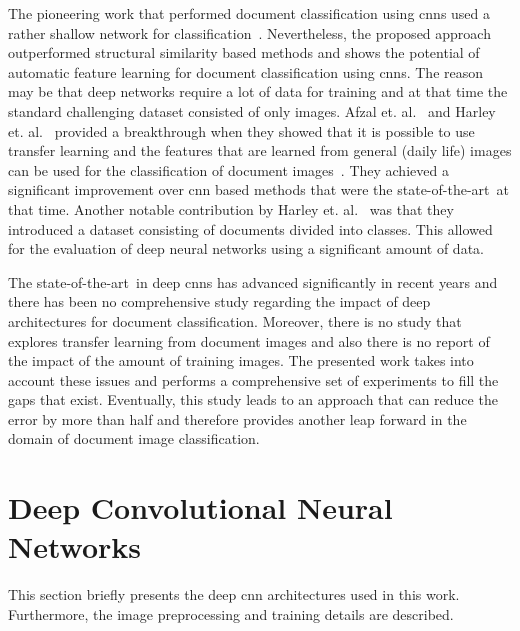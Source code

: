 \documentclass[conference]{IEEEtran}
\newcommand*{\sota}		{state-of-the-art\ }
\begin{document}
The pioneering work that performed document classification using \ac{cnn}s used a rather shallow network for classification~\cite{lekang_14_a}. Nevertheless, the proposed approach outperformed structural similarity based methods and shows the potential of automatic feature learning for document classification using \ac{cnn}s. The reason may be that deep networks require a lot of data for training and at that time the standard challenging dataset consisted of only  images.
Afzal et. al.~\cite{afzal2015deepdocclassifier} and Harley et. al.~\cite{harley2015evaluation} provided a breakthrough when they showed that it is possible to use transfer learning and the features that are learned from general (daily life) images can be used for the classification of document images~\cite{afzal2015deepdocclassifier}. They achieved a significant improvement over \ac{cnn} based methods that were the \sota at that time.
Another notable contribution by Harley et. al.~\cite{harley2015evaluation} was that they introduced a dataset consisting of  documents divided into  classes.
This allowed for the evaluation of deep neural networks using a significant amount of data. 

The \sota in deep \ac{cnn}s has advanced significantly in recent years and there has been no comprehensive study regarding the impact of deep architectures for document classification. Moreover, there is no study that explores transfer learning from document images and also there is no report of the impact of the amount of training images. The presented work takes into account these issues and performs a comprehensive set of experiments to fill the gaps that exist. Eventually, this study leads to an approach that can reduce the error by more than half and therefore provides another leap forward in the domain of document image classification.




 \section{Deep Convolutional Neural Networks}
\label{sec:networks}

This section briefly presents the deep \ac{cnn} architectures used in this work. Furthermore, the image preprocessing and training details are described.
\end{document}
